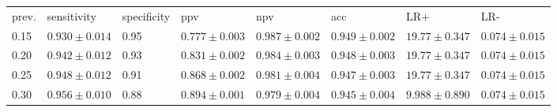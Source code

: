 \begin{tabular}{L{.3in}|L{.7in}|L{.55in}|L{.7in}|L{.7in}|L{.7in}|L{.7in}|L{.7in}}\hline
prev.&sensitivity&specificity&ppv&npv&acc&LR+&LR-\\
0.15& $0.930  \pm  0.014$ &0.95& $0.777  \pm  0.003$ & $0.987  \pm  0.002$ & $0.949  \pm  0.002$ & $19.77  \pm  0.347$ & $0.074  \pm  0.015$ \\
0.20& $0.942  \pm  0.012$ &0.93& $0.831  \pm  0.002$ & $0.984  \pm  0.003$ & $0.948  \pm  0.003$ & $19.77  \pm  0.347$ & $0.074  \pm  0.015$ \\
0.25& $0.948  \pm  0.012$ &0.91& $0.868  \pm  0.002$ & $0.981  \pm  0.004$ & $0.947  \pm  0.003$ & $19.77  \pm  0.347$ & $0.074  \pm  0.015$ \\
0.30& $0.956  \pm  0.010$ &0.88& $0.894  \pm  0.001$ & $0.979  \pm  0.004$ & $0.945  \pm  0.004$ & $9.988  \pm  0.890$ & $0.074  \pm  0.015$ \\
\hline\end{tabular}
